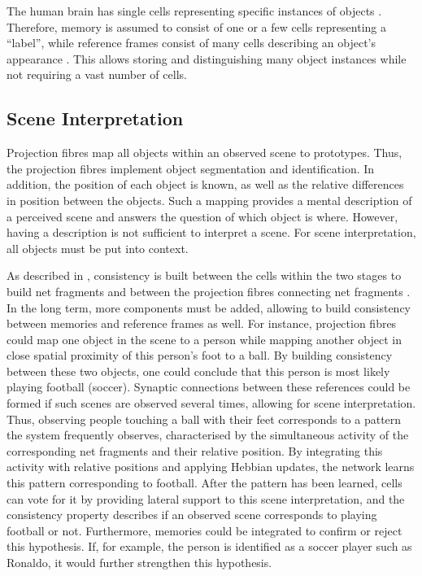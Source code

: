 The human brain has single cells representing specific instances of objects .
Therefore, memory is assumed to consist of one or a few cells representing a ``label'', while reference frames consist of many cells describing an object's appearance \cite{von_der_malsburg_concerning_2018, von_der_malsburg_theory_2022}.
This allows storing and distinguishing many object instances while not requiring a vast number of cells.


\subsection{Scene Interpretation}
Projection fibres map all objects within an observed scene to prototypes. Thus, the projection fibres implement object segmentation and identification.
In addition, the position of each object is known, as well as the relative differences in position between the objects.
Such a mapping provides a mental description of a perceived scene and answers the question of which object is where. However, having a description is not sufficient to interpret a scene. For scene interpretation, all objects must be put into context.

As described in , consistency is built between the cells within the two stages to build net fragments and between the projection fibres connecting net fragments .
In the long term, more components must be added, allowing to build consistency between memories and reference frames as well.
For instance, projection fibres could map one object in the scene to a person while mapping another object in close spatial proximity of this person's foot to a ball. By building consistency between these two objects, one could conclude that this person is most likely playing football (soccer). Synaptic connections between these references could be formed if such scenes are observed several times, allowing for scene interpretation.
Thus, observing people touching a ball with their feet corresponds to a pattern the system frequently observes, characterised by the simultaneous activity of the corresponding net fragments and their relative position. By integrating this activity with relative positions and applying Hebbian updates, the network learns this pattern corresponding to football. 
After the pattern has been learned, cells can vote for it by providing lateral support to this scene interpretation, and the consistency property describes if an observed scene corresponds to playing football or not.
Furthermore, memories  could be integrated to confirm or reject this hypothesis. If, for example, the person is identified as a soccer player such as Ronaldo, it would further strengthen this hypothesis.

